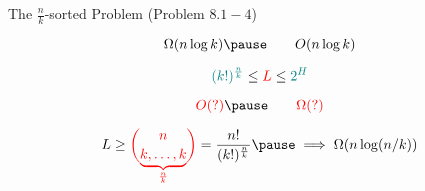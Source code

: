 
\begin{frame}{}
  \begin{exampleblock}{The $\frac{n}{k}$-sorted Problem (Problem $8.1-4$)}
    \centerline{}

    \pause
    \vspace{-0.50cm}
    \[
      \Omega(n \log k) \pause \qquad O(n \log k)
    \]

    \pause
    \vspace{-0.30cm}
    \[
      \textcolor{teal}{(k!)^{\frac{n}{k}}} \le \textcolor{red}{L} \le \textcolor{teal}{2^{H}}
    \]
  \end{exampleblock}
\end{frame}

\begin{frame}{}
  \centerline{}

  \pause
  \vspace{-0.30cm}
  \[
    \red{O(?)} \pause \qquad \red{\Omega(?)}
  \]

  \pause
  \vspace{-0.30cm}
  \[
    L \ge \red{\binom{n}{\underbrace{k, \ldots, k}_{\frac{n}{k}}}} = \frac{n!}{(k!)^{\frac{n}{k}}} \pause \implies \Omega(n \log(n/k))
  \]
\end{frame}
